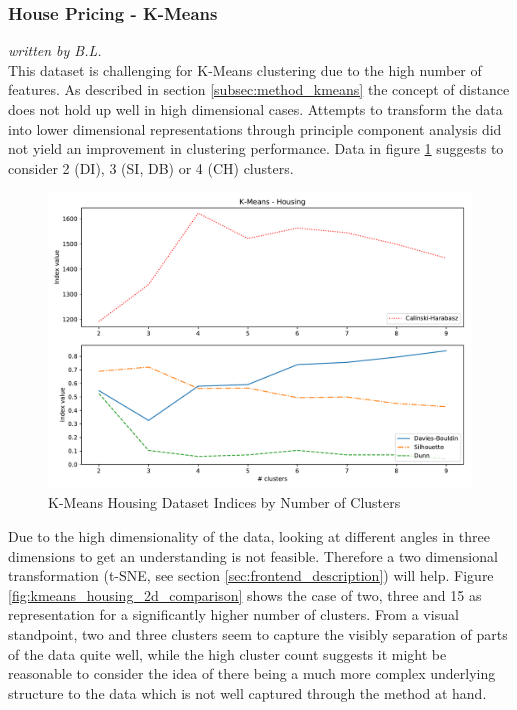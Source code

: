 \subsubsection{House Pricing - K-Means}
\textit{written by B.L.}\\

This dataset is challenging for K-Means clustering due to the high number of features. As described in section \ref{subsec:method_kmeans} the concept of distance does not hold up well in high dimensional cases. Attempts to transform the data into lower dimensional representations through principle component analysis did not yield an improvement in clustering performance. Data in figure \ref{fig:kmeans_housing_indices_plot} suggests to consider 2 (\gls{DI}), 3 (\gls{SI}, \gls{DB}) or 4 (\gls{CH}) clusters.

\begin{figure}[H]
\caption{K-Means Housing Dataset Indices by Number of Clusters}
\begin{center}
\includegraphics[width=1.0\textwidth]{images/kmeans_housing_index_plot.pdf}
\end{center}
\label{fig:kmeans_housing_indices_plot}
\end{figure}

\vspace{-0.5cm}
Due to the high dimensionality of the data, looking at different angles in three dimensions to get an understanding is not feasible. Therefore a two dimensional transformation (t-SNE, see section \ref{sec:frontend_description}) will help. Figure \ref{fig:kmeans_housing_2d_comparison} shows the case of two, three and 15 as representation for a significantly higher number of clusters. From a visual standpoint, two and three clusters seem to capture the visibly separation of parts of the data quite well, while the high cluster count suggests it might be reasonable to consider the idea of there being a much more complex underlying structure to the data which is not well captured through the method at hand.

